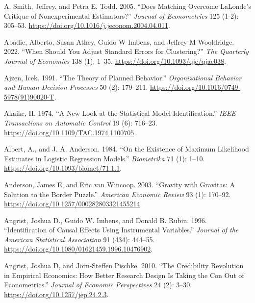 \documentclass[
  letterpaper,
  10pt,
  twoside,
  openright,
  numbers=noenddot,
  chapterprefix=true]{scrbook}
\newlength{\cslhangindent}
\newenvironment{CSLReferences}[2] %
 {\begin{list}{}{%
  \setlength{\itemindent}{0pt}
  \setlength{\leftmargin}{0pt}
  \setlength{\parsep}{0pt}
  \ifodd #1
   \setlength{\leftmargin}{\cslhangindent}
   \setlength{\itemindent}{-1\cslhangindent}
  \fi
  \setlength{\itemsep}{#2\baselineskip}}}
 {\end{list}}
\begin{document}
\label{refs}
\begin{CSLReferences}{1}{0}
A. Smith, Jeffrey, and Petra E. Todd. 2005. {``{Does} Matching Overcome
{LaLonde}'s Critique of Nonexperimental Estimators?''} \emph{{Journal}
of {Econometrics}} 125 (1-2): 305--53.
\url{https://doi.org/10.1016/j.jeconom.2004.04.011}.

Abadie, Alberto, Susan Athey, Guido W Imbens, and Jeffrey M Wooldridge.
2022. {``{When} {Should} {You} {Adjust} {Standard} {Errors} for
{Clustering}?''} \emph{{The} {Quarterly} {Journal} of {Economics}} 138
(1): 1--35. \url{https://doi.org/10.1093/qje/qjac038}.

Ajzen, Icek. 1991. {``{The} Theory of Planned Behavior.''}
\emph{{Organizational} {Behavior} and {Human} {Decision} {Processes}} 50
(2): 179--211. \url{https://doi.org/10.1016/0749-5978(91)90020-T}.

Akaike, H. 1974. {``A New Look at the Statistical Model
Identification.''} \emph{{IEEE} {Transactions} on {Automatic} {Control}}
19 (6): 716--23. \url{https://doi.org/10.1109/TAC.1974.1100705}.

Albert, A., and J. A. Anderson. 1984. {``{On} the Existence of Maximum
Likelihood Estimates in Logistic Regression Models.''}
\emph{{Biometrika}} 71 (1): 1--10.
\url{https://doi.org/10.1093/biomet/71.1.1}.

Anderson, James E, and Eric van Wincoop. 2003. {``{Gravity} with
{Gravitas}: A {Solution} to the {Border} {Puzzle}.''} \emph{{American}
{Economic} {Review}} 93 (1): 170--92.
\url{https://doi.org/10.1257/000282803321455214}.

Angrist, Joshua D., Guido W. Imbens, and Donald B. Rubin. 1996.
{``{Identification} of {Causal} {Effects} {Using} {Instrumental}
{Variables}.''} \emph{{Journal} of the {American} {Statistical}
{Association}} 91 (434): 444--55.
\url{https://doi.org/10.1080/01621459.1996.10476902}.

Angrist, Joshua D, and Jörn-Steffen Pischke. 2010. {``{The}
{Credibility} {Revolution} in {Empirical} {Economics}: {How} {Better}
{Research} {Design} Is {Taking} the {Con} Out of {Econometrics}.''}
\emph{{Journal} of {Economic} {Perspectives}} 24 (2): 3--30.
\url{https://doi.org/10.1257/jep.24.2.3}.


\end{CSLReferences}
\end{document}
